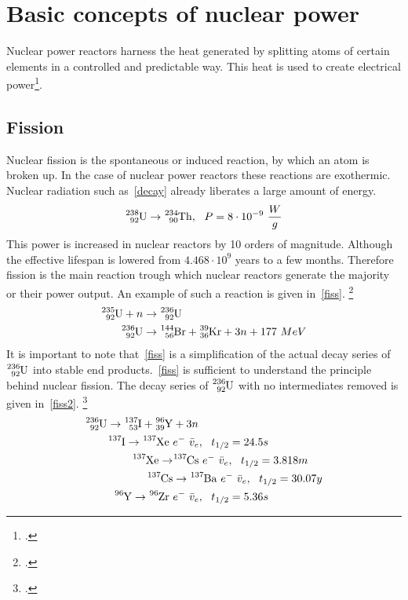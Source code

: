 \chapter{Basic concepts of nuclear power}
Nuclear power reactors harness the heat generated by splitting atoms of certain
elements in a controlled and predictable way. This heat is used to create electrical power\footcite{WNPR}.
\section{Fission}
Nuclear fission is the spontaneous or induced reaction, by which an atom is broken up. In the
case of nuclear power reactors these reactions are exothermic. Nuclear radiation such as~\ref{decay}
already liberates a large amount of energy.
\begin{equation} \label{decay}
    \ce{^{238}_{92}U} \rightarrow \ce{^{234}_{90}Th}, ~~P = 8 \cdot 10^{-9} ~\frac{W}{g}
\end{equation}
This power is increased in nuclear reactors by 10 orders of magnitude. Although the effective lifespan
is lowered from $4.468 \cdot 10^{9}$ years to a few months. Therefore fission is the main reaction
trough which nuclear reactors generate the majority or their power output. An example of such
a reaction is given in~\ref{fiss}. \footcite[286]{nucfundamentals}
\begin{equation} \label{fiss}
\begin{split}
    \ce{^{235}_{92}U} + n & \rightarrow \ce{^{236}_{92}U} \\
    \ce{^{236}_{92}U} & \rightarrow \ce{^{144}_{56}Br} + \ce{^{39}_{36}Kr} + 3n + 177 ~MeV
\end{split}
\end{equation}
It is important to note that~\ref{fiss} is a simplification of the actual decay series of $\ce{^{236}_{92}U}$ into
stable end products.~\ref{fiss} is sufficient to understand the principle behind nuclear fission.
The decay series of $\ce{^{236}_{92}U}$ with no intermediates removed is given in~\ref{fiss2}. \footcite[287]{nucfundamentals}
\begin{equation} \label{fiss2}
    \begin{split}
        \ce{^{236}_{92}U} \rightarrow \ce{^{137}_{53}I} + \ce{^{96}_{39}Y} & + 3n \\
            \ce{^{137}I} \rightarrow \ce{^{137}Xe} ~ & e^{-} ~ \bar{v}_{e}, ~~t_{1/2}=24.5s \\
                \ce{^{137}Xe} \rightarrow & \ce{^{137}Cs} ~ e^{-} ~ \bar{v}_{e}, ~~t_{1/2}=3.818m \\
                    \ce{^{137}Cs}& \rightarrow \ce{^{137}Ba} ~ e^{-} ~ \bar{v}_{e}, ~~t_{1/2}=30.07y \\
            \ce{^{96}Y} \rightarrow \ce{^{96}Zr} ~ & e^{-} ~ \bar{v}_{e}, ~~t_{1/2}=5.36s 
    \end{split}
\end{equation}
